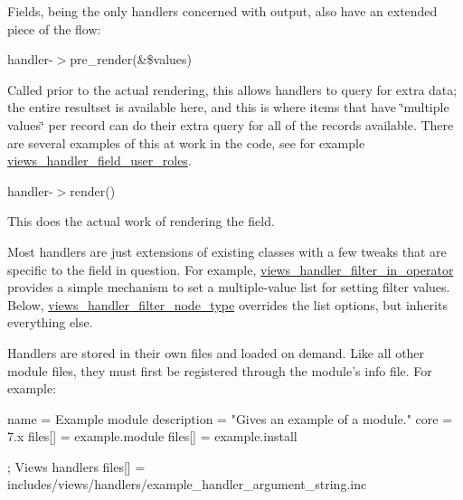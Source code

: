 Fields, being the only handlers concerned with output, also have an extended piece of the flow:


\begin{DoxyItemize}
\item handler-\/$>$pre\_\-render(\&\$values)
\begin{DoxyItemize}
\item Called prior to the actual rendering, this allows handlers to query for extra data; the entire resultset is available here, and this is where items that have \char`\"{}multiple values\char`\"{} per record can do their extra query for all of the records available. There are several examples of this at work in the code, see for example \hyperlink{classviews__handler__field__user__roles}{views\_\-handler\_\-field\_\-user\_\-roles}.
\end{DoxyItemize}
\item handler-\/$>$render()
\begin{DoxyItemize}
\item This does the actual work of rendering the field.
\end{DoxyItemize}
\end{DoxyItemize}

Most handlers are just extensions of existing classes with a few tweaks that are specific to the field in question. For example, \hyperlink{classviews__handler__filter__in__operator}{views\_\-handler\_\-filter\_\-in\_\-operator} provides a simple mechanism to set a multiple-\/value list for setting filter values. Below, \hyperlink{classviews__handler__filter__node__type}{views\_\-handler\_\-filter\_\-node\_\-type} overrides the list options, but inherits everything else.




Handlers are stored in their own files and loaded on demand. Like all other module files, they must first be registered through the module's info file. For example:


\begin{DoxyCode}
 name = Example module
 description = "Gives an example of a module."
 core = 7.x
 files[] = example.module
 files[] = example.install

 ; Views handlers
 files[] = includes/views/handlers/example_handler_argument_string.inc
\end{DoxyCode}


